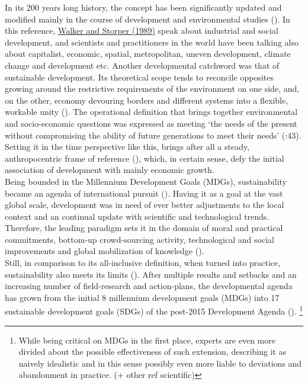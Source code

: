 \documentclass[11pt]{report}
\begin{document}
In its 200 years long history, the concept has been significantly updated and modified mainly in the course of development and environmental studies (\href{Vujosevic}{\cite{VujosevicEtAl.2012}}). 
In this reference, \href{Walker}{Walker and Storper (1989)} speak about industrial and social development, and scientists and practitioners in the world have been talking also about capitalist, economic, spatial, metropolitan, uneven development, climate change and development etc.
Another developmental catchword was that of sustainable development.
Its theoretical scope tends to reconcile opposites growing around the restrictive requirements of the environment on one side, and, on the other, economy devouring borders and different systems into a flexible, workable unity (\href{ref}{\cite{Bolay what sustainable development 2012}}).
The operational definition that brings together environmental and socio-economic questions was expressed as meeting ‘the needs of the present without compromising the ability of future generations to meet their needs’ (\href{WCED}{\cite{WCED1987????????}}:43).
Setting it in the time perspective like this, brings after all a steady, anthropocentric frame of reference (\href{Lee}{\cite{Lee2000}}), which, in certain sense, defy the initial association of development with mainly economic growth.
\\

Being bounded in the Millennium Development Goals (MDGs), sustainability became an agenda of international pursuit (\href{MDG}{\cite{MDG ??????}}).
Having it as a goal at the vast global scale, development was in need of ever better adjustments to the local context and an continual update with scientific and technological trends.
Therefore, the leading paradigm sets it in the domain of moral and practical commitments, bottom-up crowd-sourcing activity, technological and social improvements and global mobilization of knowledge (\href{Sachs}{\cite{Sachs2012????}}).
\\

Still, in comparison to its all-inclusive definition, when turned into practice, sustainability also meets its limits (\href{ref}{\cite{Bolay what sustainable development 2012}}).
After multiple results and setbacks and an increasing number of field-research and action-plans, the developmental agenda has grown from the initial 8 millennium development goals (MDGs) into 17 sustainable development goals (SDGs) of the post-2015 Development Agenda (\href{SDG}{\cite{Post-2015DevelopmentAgenda ??????}}).
\footnote{While being critical on MDGs in the first place, experts are even more divided about the possible effectiveness of such extension, describing it as naively idealistic and in this sense possibly even more liable to deviations and abandonment in practice.
(\href{FinancialTimes}{\cite{FT}}+ other ref scientific)}
\\
\end{document}
